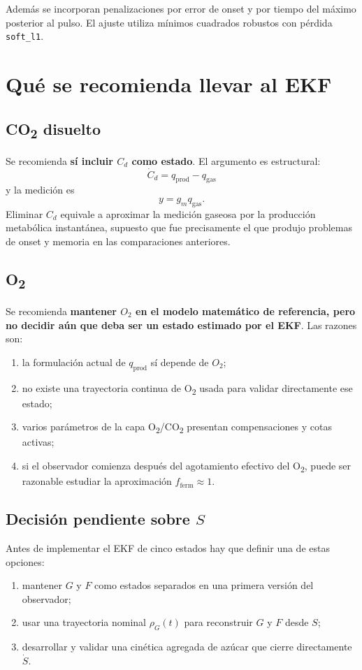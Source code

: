 \documentclass[11pt,a4paper]{article}
\begin{document}
Además se incorporan penalizaciones por error de onset y por tiempo del máximo posterior al pulso.
El ajuste utiliza mínimos cuadrados robustos con pérdida \texttt{soft\_l1}.

\section{Qué se recomienda llevar al EKF}

\subsection{CO\textsubscript{2} disuelto}

Se recomienda \textbf{sí incluir $C_d$ como estado}. El argumento es estructural:
\[
\dot C_d=q_{\mathrm{prod}}-q_{\mathrm{gas}}
\]
y la medición es
\[
y=g_mq_{\mathrm{gas}}.
\]
Eliminar $C_d$ equivale a aproximar la medición gaseosa por la producción metabólica instantánea,
supuesto que fue precisamente el que produjo problemas de onset y memoria en las comparaciones
anteriores.

\subsection{O\textsubscript{2}}

Se recomienda \textbf{mantener $O_2$ en el modelo matemático de referencia, pero no decidir aún
que deba ser un estado estimado por el EKF}. Las razones son:
\begin{enumerate}
    \item la formulación actual de $q_{\mathrm{prod}}$ sí depende de $O_2$;
    \item no existe una trayectoria continua de O\textsubscript{2} usada para validar directamente ese estado;
    \item varios parámetros de la capa O\textsubscript{2}/CO\textsubscript{2} presentan compensaciones y cotas activas;
    \item si el observador comienza después del agotamiento efectivo del O\textsubscript{2}, puede ser razonable
    estudiar la aproximación $f_{\mathrm{ferm}}\approx1$.
\end{enumerate}

\subsection{Decisión pendiente sobre $S$}

Antes de implementar el EKF de cinco estados hay que definir una de estas opciones:
\begin{enumerate}
    \item mantener $G$ y $F$ como estados separados en una primera versión del observador;
    \item usar una trayectoria nominal $\rho_G(t)$ para reconstruir $G$ y $F$ desde $S$;
    \item desarrollar y validar una cinética agregada de azúcar que cierre directamente $\dot S$.
\end{enumerate}
\end{document}
